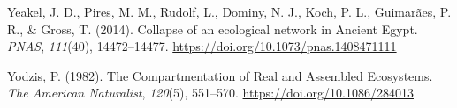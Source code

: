 \documentclass[
]{article}
\newlength{\cslhangindent}
\newenvironment{CSLReferences}[2] %
 {\begin{list}{}{%
  \setlength{\itemindent}{0pt}
  \setlength{\leftmargin}{0pt}
  \setlength{\parsep}{0pt}
  \ifodd #1
   \setlength{\leftmargin}{\cslhangindent}
   \setlength{\itemindent}{-1\cslhangindent}
  \fi
  \setlength{\itemsep}{#2\baselineskip}}}
 {\end{list}}
\begin{document}
\begin{CSLReferences}{1}{0}
Yeakel, J. D., Pires, M. M., Rudolf, L., Dominy, N. J., Koch, P. L.,
Guimarães, P. R., \& Gross, T. (2014). Collapse of an ecological network
in {Ancient Egypt}. \emph{PNAS}, \emph{111}(40), 14472--14477.
\url{https://doi.org/10.1073/pnas.1408471111}

Yodzis, P. (1982). The {Compartmentation} of {Real} and {Assembled
Ecosystems}. \emph{The American Naturalist}, \emph{120}(5), 551--570.
\url{https://doi.org/10.1086/284013}

\end{CSLReferences}
\end{document}
